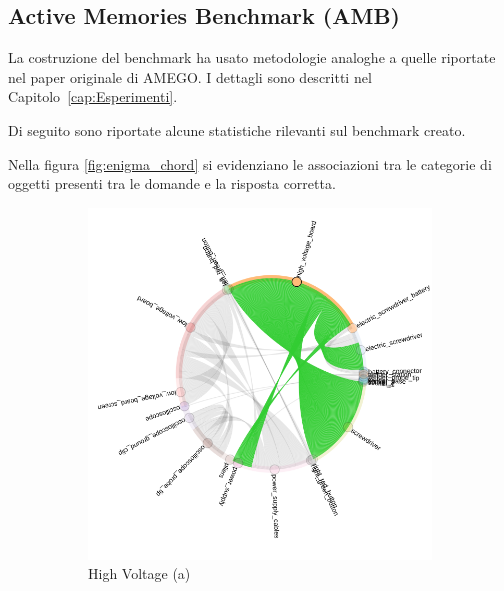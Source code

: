 \subsection*{Active Memories Benchmark (AMB)}

La costruzione del benchmark ha usato metodologie analoghe a quelle riportate nel paper originale di AMEGO. I dettagli sono descritti nel Capitolo~\ref{cap:Esperimenti}.  

Di seguito sono riportate alcune statistiche rilevanti sul benchmark creato.

Nella figura \autoref{fig:enigma_chord} si evidenziano le associazioni tra le categorie di oggetti presenti tra le domande e la risposta corretta.

\begin{figure}[ht]
    \centering
    \begin{subfigure}[b]{0.32\textwidth}
        \includegraphics[width=\linewidth]{Images/enigma_amb_high_voltage.png}
        \caption{High Voltage (a)}
        \label{fig:high_voltage}
    \end{subfigure}
    \hfill
    \begin{subfigure}[b]{0.32\textwidth}

\end{subfigure}
\end{figure}
